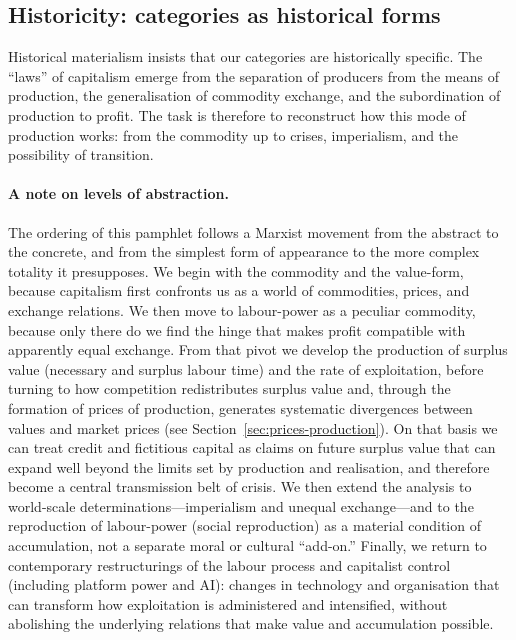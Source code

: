 \subsection{Historicity: categories as historical forms}

Historical materialism insists that our categories are historically specific. The ``laws''
of capitalism emerge from the separation of producers from the means of production, the
generalisation of commodity exchange, and the subordination of production to profit.
The task is therefore to reconstruct how this mode of production works: from the commodity
up to crises, imperialism, and the possibility of transition.\cite{EngelsAntiDuhring,Shaikh2016}

\paragraph{A note on levels of abstraction.}
The ordering of this pamphlet follows a Marxist movement from the abstract to the concrete,
and from the simplest form of appearance to the more complex totality it presupposes.
We begin with the commodity and the value-form, because capitalism first confronts us as
a world of commodities, prices, and exchange relations.\cite{Marx1867} We then move to
labour-power as a peculiar commodity, because only there do we find the hinge that makes
profit compatible with apparently equal exchange. From that pivot we develop the production
of surplus value (necessary and surplus labour time) and the rate of exploitation, before
turning to how competition redistributes surplus value and, through the formation of prices
of production, generates systematic divergences between values and market prices (see
Section~\ref{sec:prices-production}). On that basis we can treat credit and fictitious
capital as claims on future surplus value that can expand well beyond the limits set by
production and realisation, and therefore become a central transmission belt of crisis.
We then extend the analysis to world-scale determinations---imperialism and unequal exchange---and
to the reproduction of labour-power (social reproduction) as a material condition of accumulation,
not a separate moral or cultural ``add-on.'' Finally, we return to contemporary restructurings of
the labour process and capitalist control (including platform power and AI): changes in technology
and organisation that can transform how exploitation is administered and intensified, without
abolishing the underlying relations that make value and accumulation possible.

